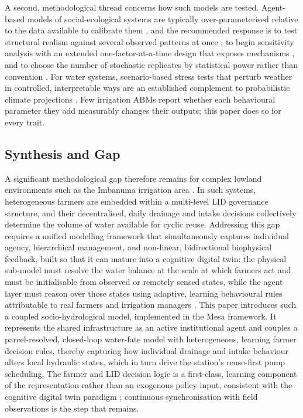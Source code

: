 \documentclass{article}
\begin{document}
\begin{added}
A second, methodological thread concerns how such models are tested. Agent-based models of social-ecological systems are typically over-parameterised relative to the data available to calibrate them \cite{TroostBerger2015}, and the recommended response is to test structural realism against several observed patterns at once \cite{Grimm2005POM}, to begin sensitivity analysis with an extended one-factor-at-a-time design that exposes mechanisms \cite{tenBroeke2016}, and to choose the number of stochastic replicates by statistical power rather than convention \cite{Lee2015Output, SeriSecchi2017}. For water systems, scenario-based stress tests that perturb weather in controlled, interpretable ways are an established complement to probabilistic climate projections \cite{Brown2012DecisionScaling}. Few irrigation ABMs report whether each behavioural parameter they add measurably changes their outputs; this paper does so for every trait.
\end{added}

\subsection{Synthesis and Gap}
\begin{changed}
A significant methodological gap therefore remains for complex lowland environments such as the Imbanuma irrigation area \cite{Okura2025WaterBalance}. In such systems, heterogeneous farmers are embedded within a multi-level LID governance structure, and their decentralised, daily drainage and intake decisions collectively determine the volume of water available for cyclic reuse. Addressing this gap requires a unified modelling framework that simultaneously captures individual agency, hierarchical management, and non-linear, bidirectional biophysical feedback, built so that it can mature into a cognitive digital twin: the physical sub-model must resolve the water balance at the scale at which farmers act and must be initialisable from observed or remotely sensed states, while the agent layer must reason over those states using adaptive, learning behavioural rules attributable to real farmers and irrigation managers \cite{Tao2019DigitalTwin, Tao2021DigitalTwin, Verdouw2021AgricultureDT}. This paper introduces such a coupled socio-hydrological model, implemented in the Mesa framework. It represents the shared infrastructure as an active institutional agent and couples a parcel-resolved, closed-loop water-fate model with heterogeneous, learning farmer decision rules, thereby capturing how individual drainage and intake behaviour alters local hydraulic states, which in turn drive the station's reuse-first pump scheduling. The farmer and LID decision logic is a first-class, learning component of the representation rather than an exogenous policy input, consistent with the cognitive digital twin paradigm \cite{Tao2021DigitalTwin, Rasheed2020DigitalTwin}; continuous synchronisation with field observations is the step that remains.
\end{changed}
\end{document}
